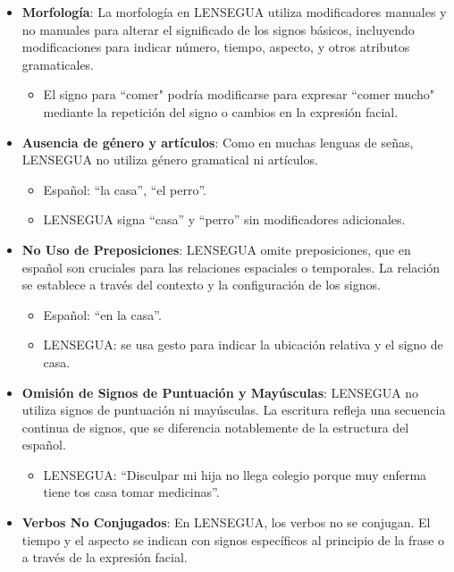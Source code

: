 \begin{itemize}
    \item \textbf{Morfología}: La morfología en LENSEGUA utiliza modificadores manuales y no manuales para alterar el significado de los signos básicos, incluyendo modificaciones para indicar número, tiempo, aspecto, y otros atributos gramaticales.
    \begin{itemize}
        \item El signo para ``comer" podría modificarse para expresar ``comer mucho" mediante la repetición del signo o cambios en la expresión facial.
    \end{itemize}
    \item \textbf{Ausencia de género y artículos}: Como en muchas lenguas de señas, LENSEGUA no utiliza género gramatical ni artículos.
    \begin{itemize}
        \item Español: ``la casa'', ``el perro''.
        \item LENSEGUA signa ``casa'' y ``perro'' sin modificadores adicionales.
    \end{itemize}
    \item \textbf{No Uso de Preposiciones}: LENSEGUA omite preposiciones, que en español son cruciales para las relaciones espaciales o temporales. La relación se establece a través del contexto y la configuración de los signos.
    \begin{itemize}
        \item Español: ``en la casa''.
        \item LENSEGUA: se usa gesto para indicar la ubicación relativa y el signo de casa.
    \end{itemize}
    \item \textbf{Omisión de Signos de Puntuación y Mayúsculas}: LENSEGUA no utiliza signos de puntuación ni mayúsculas. La escritura refleja una secuencia continua de signos, que se diferencia notablemente de la estructura del español.
    \begin{itemize}
        \item LENSEGUA: ``Disculpar mi hija no llega colegio porque muy enferma tiene tos casa tomar medicinas''.
    \end{itemize}
    \item \textbf{Verbos No Conjugados}: En LENSEGUA, los verbos no se conjugan. El tiempo y el aspecto se indican con signos específicos al principio de la frase o a través de la expresión facial.
    \begin{itemize}

\end{itemize}
\end{itemize}
